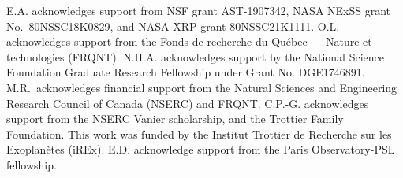 \documentclass[modern]{aastex631}
\begin{document}
\begin{acknowledgments}
E.A. acknowledges support from NSF grant AST-1907342, NASA NExSS grant No.\ 80NSSC18K0829, and NASA XRP grant 80NSSC21K1111.
O.L. acknowledges support from the Fonds de recherche du Qu\'{e}bec --- Nature et technologies (FRQNT). N.H.A. acknowledges support by the National Science Foundation Graduate Research Fellowship under Grant No. DGE1746891. M.R.\ acknowledges financial support from the Natural Sciences and Engineering Research Council of Canada (NSERC) and FRQNT. C.P.-G. acknowledges support from the NSERC Vanier scholarship, and the Trottier Family Foundation. This work was funded by the Institut Trottier de Recherche sur les Exoplan\`{e}tes (iREx).
E.D. acknowledge support from the Paris Observatory-PSL fellowship. 
\end{acknowledgments}

%

\vspace{5mm}

\end{document}
